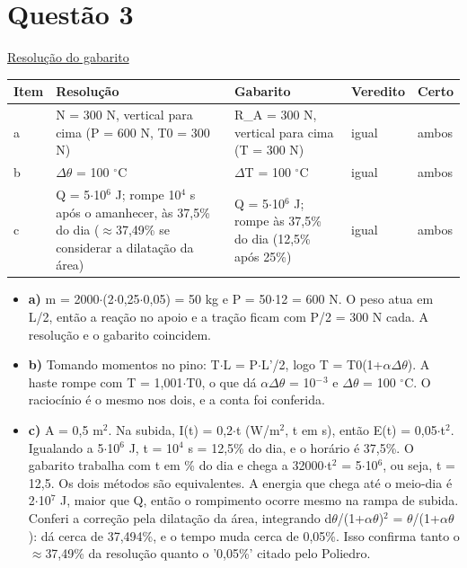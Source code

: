 \documentclass{article}%
\begin{document}
\section*{Questão 3}%
\href{https://poliedroresolve.sistemapoliedro.com.br/vestibulares/ime/2027/ime-2-fase-dia-2-27-10-2026-2-fase-dia-2/dissertativa-3-fisica-2-fase-dia-2-ime-2027}{Resolução do gabarito}\par\smallskip%
\begin{longtable}{@{}p{} p{} p{} p{} p{}@{}}\toprule Item & Resolução & Gabarito & Veredito & Certo \\ \midrule
a & N = 300 N, vertical para cima (P = 600 N, T0 = 300 N) & R\_A = 300 N, vertical para cima (T = 300 N) & igual & ambos \\
b & $\Delta$$\theta$ = 100 $^\circ$C & $\Delta$T = 100 $^\circ$C & igual & ambos \\
c & Q = 5$\cdot$10$^{6}$ J; rompe 10$^{4}$ s após o amanhecer, às 37,5\% do dia ($\approx$37,49\% se considerar a dilatação da área) & Q = 5$\cdot$10$^{6}$ J; rompe às 37,5\% do dia (12,5\% após 25\%) & igual & ambos \\
\bottomrule\end{longtable}%
\begin{itemize}%
\item%
\textbf{a)} m = 2000$\cdot$(2$\cdot$0,25$\cdot$0,05) = 50 kg e P = 50$\cdot$12 = 600 N. O peso atua em L/2, então a reação no apoio e a tração ficam com P/2 = 300 N cada. A resolução e o gabarito coincidem.%
\item%
\textbf{b)} Tomando momentos no pino: T$\cdot$L = P$\cdot$L'/2, logo T = T0(1+$\alpha$$\Delta$$\theta$). A haste rompe com T = 1,001$\cdot$T0, o que dá $\alpha$$\Delta$$\theta$ = 10$^{-}$$^3$ e $\Delta$$\theta$ = 100 $^\circ$C. O raciocínio é o mesmo nos dois, e a conta foi conferida.%
\item%
\textbf{c)} A = 0,5 m$^2$. Na subida, I(t) = 0,2$\cdot$t (W/m$^2$, t em s), então E(t) = 0,05$\cdot$t$^2$. Igualando a 5$\cdot$10$^{6}$ J, t = 10$^{4}$ s = 12,5\% do dia, e o horário é 37,5\%. O gabarito trabalha com t em \% do dia e chega a 32000$\cdot$t$^2$ = 5$\cdot$10$^{6}$, ou seja, t = 12,5. Os dois métodos são equivalentes. A energia que chega até o meio{-}dia é 2$\cdot$10$^{7}$ J, maior que Q, então o rompimento ocorre mesmo na rampa de subida. Conferi a correção pela dilatação da área, integrando d$\theta$/(1+$\alpha$$\theta$)$^2$ = $\theta$/(1+$\alpha$$\theta$): dá cerca de 37,494\%, e o tempo muda cerca de 0,05\%. Isso confirma tanto o $\approx$37,49\% da resolução quanto o '0,05\%' citado pelo Poliedro.%
\end{itemize}%
\end{document}
